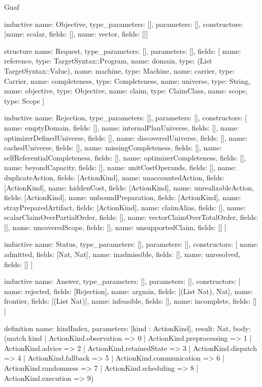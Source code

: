 \begin{lexlean}{Gnaf}
\begin{semanticmodule}
inductive{
  name: Objective,
  type_parameters: [],
  parameters: [],
  constructors: [{name: scalar, fields: []}, {name: vector, fields: []}]
}

structure{
  name: Request,
  type_parameters: [],
  parameters: [],
  fields: [
    {name: reference, type: TargetSyntax::Program},
    {name: domain, type: (List TargetSyntax::Value)},
    {name: machine, type: Machine},
    {name: carrier, type: Carrier},
    {name: completeness, type: Completeness},
    {name: universe, type: String},
    {name: objective, type: Objective},
    {name: claim, type: ClaimClass},
    {name: scope, type: Scope}
  ]
}

inductive{
  name: Rejection,
  type_parameters: [],
  parameters: [],
  constructors: [
    {name: emptyDomain, fields: []},
    {name: internalPlanUniverse, fields: []},
    {name: optimizerDefinedUniverse, fields: []},
    {name: discoveredUniverse, fields: []},
    {name: cachedUniverse, fields: []},
    {name: missingCompleteness, fields: []},
    {name: selfReferentialCompleteness, fields: []},
    {name: optimizerCompleteness, fields: []},
    {name: beyondCapacity, fields: []},
    {name: unitCostOperands, fields: []},
    {name: duplicateAction, fields: [ActionKind]},
    {name: unaccountedAction, fields: [ActionKind]},
    {name: hiddenCost, fields: [ActionKind]},
    {name: unrealizableAction, fields: [ActionKind]},
    {name: unboundPreparation, fields: [ActionKind]},
    {name: strayPreparedArtifact, fields: [ActionKind]},
    {name: claimAlias, fields: []},
    {name: scalarClaimOverPartialOrder, fields: []},
    {name: vectorClaimOverTotalOrder, fields: []},
    {name: uncoveredScope, fields: []},
    {name: unsupportedClaim, fields: []}
  ]
}

inductive{
  name: Status,
  type_parameters: [],
  parameters: [],
  constructors: [
    {name: admitted, fields: [Nat, Nat]},
    {name: inadmissible, fields: []},
    {name: unresolved, fields: []}
  ]
}

inductive{
  name: Answer,
  type_parameters: [],
  parameters: [],
  constructors: [
    {name: rejected, fields: [Rejection]},
    {name: argmin, fields: [(List Nat), Nat]},
    {name: frontier, fields: [(List Nat)]},
    {name: infeasible, fields: []},
    {name: incomplete, fields: []}
  ]
}

definition{
  name: kindIndex,
  parameters: [kind : ActionKind],
  result: Nat,
  body: (match kind
    | ActionKind.observation => 0
    | ActionKind.preprocessing => 1
    | ActionKind.advice => 2
    | ActionKind.retainedState => 3
    | ActionKind.dispatch => 4
    | ActionKind.fallback => 5
    | ActionKind.communication => 6
    | ActionKind.randomness => 7
    | ActionKind.scheduling => 8
    | ActionKind.execution => 9)
}


\end{semanticmodule}
\end{lexlean}
